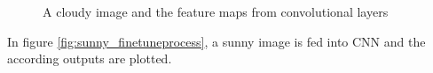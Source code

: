 \begin{figure}[htb]
{\begin{minipage}{0.3\textwidth}
		   		\label{fig:cloudy_conv4}
		\end{minipage}
    	} 

    \caption{A cloudy image and the feature maps from convolutional layers}%

    \label{fig:cloudy_finetuneprocess}%
\end{figure}

In figure \ref{fig:sunny_finetuneprocess}, a sunny image is fed into CNN and the according outputs are plotted.

